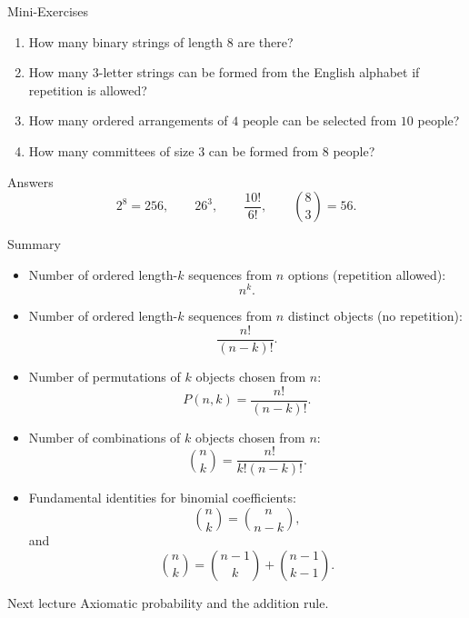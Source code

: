 \begin{frame}{Mini-Exercises}
\begin{enumerate}
    \item How many binary strings of length $8$ are there?

    \item How many $3$-letter strings can be formed from the English alphabet if repetition is allowed?

    \item How many ordered arrangements of $4$ people can be selected from $10$ people?

    \item How many committees of size $3$ can be formed from $8$ people?

\end{enumerate}

\vspace{0.25cm}

\begin{livebox}{Answers}
\[
2^8=256,
\qquad
26^3,
\qquad
\frac{10!}{6!},
\qquad
\binom83=56.
\]
\end{livebox}
\end{frame}
\begin{frame}{Summary}
\begin{itemize}

    \item Number of ordered length-$k$ sequences from $n$ options (repetition allowed):
    \[
    n^k.
    \]

    \item Number of ordered length-$k$ sequences from $n$ distinct objects (no repetition):
    \[
    \frac{n!}{(n-k)!}.
    \]

    \item Number of permutations of $k$ objects chosen from $n$:
    \[
    P(n,k)=\frac{n!}{(n-k)!}.
    \]

    \item Number of combinations of $k$ objects chosen from $n$:
    \[
    \binom{n}{k}
    =
    \frac{n!}{k!(n-k)!}.
    \]

    \item Fundamental identities for binomial coefficients:
    \[
    \binom{n}{k}
    =
    \binom{n}{n-k},
    \]
    and
    \[
    \binom{n}{k}
    =
    \binom{n-1}{k}
    +
    \binom{n-1}{k-1}.
    \]
\end{itemize}

\vspace{0.25cm}

\begin{keybox}{Next lecture}
Axiomatic probability and the addition rule.
\end{keybox}
\end{frame}